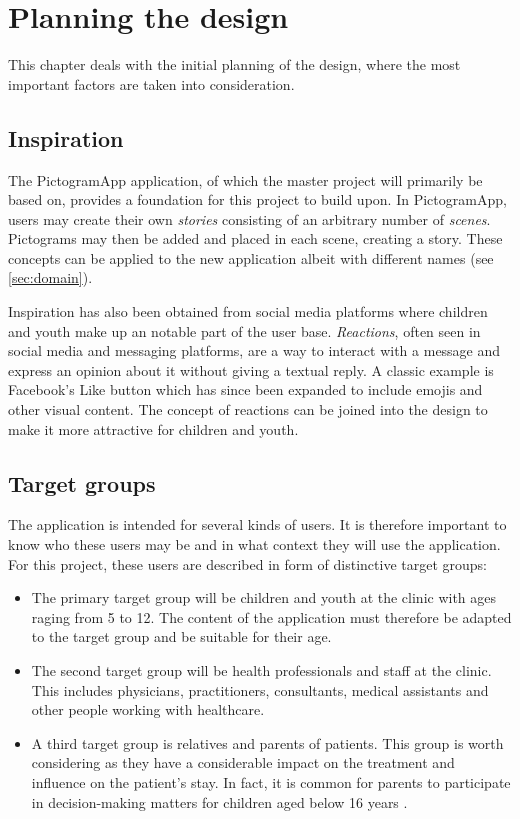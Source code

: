 \chapter{Planning the design}
\label{ch:planning}

This chapter deals with the initial planning of the design, where the most important factors are taken into consideration.

\section{Inspiration}
\label{sec:inspiration}

The PictogramApp application, of which the master project will primarily be based on, provides a foundation for this project to build upon. In PictogramApp, users may create their own \emph{stories} consisting of an arbitrary number of \emph{scenes}. Pictograms may then be added and placed in each scene, creating a story. These concepts can be applied to the new application albeit with different names (see \autoref{sec:domain}).

Inspiration has also been obtained from social media platforms where children and youth make up an notable part of the user base. \emph{Reactions}, often seen in social media and messaging platforms, are a way to interact with a message and express an opinion about it without giving a textual reply. A classic example is Facebook's Like button which has since been expanded to include emojis and other visual content. The concept of reactions can be joined into the design to make it more attractive for children and youth.

\section{Target groups}
\label{sec:targetgroups}

The application is intended for several kinds of users. It is therefore important to know who these users may be and in what context they will use the application. For this project, these users are described in form of distinctive target groups:

\begin{itemize}
    \item The primary target group will be children and youth at the clinic with ages raging from 5 to 12. The content of the application must therefore be adapted to the target group and be suitable for their age.
    \item The second target group will be health professionals and staff at the clinic. This includes physicians, practitioners, consultants, medical assistants and other people working with healthcare.
    \item A third target group is relatives and parents of patients. This group is worth considering as they have a considerable impact on the treatment and influence on the patient's stay. In fact, it is common for parents to participate in decision-making matters for children aged below 16 years \autocite{helsedirektoratet2018}.
\end{itemize}

